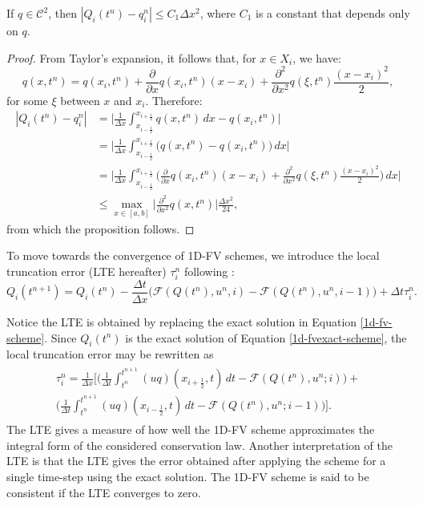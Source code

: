 \begin{prop}
	\label{prop-bound-centroid}
	If $q \in \mathcal{C}^2$, then $|Q_i(t^n)-q_i^n|\leq C_1 \Delta x^2$, where $C_1$ is a constant that depends only on $q$. 
\end{prop}
\begin{proof}
	From Taylor's expansion, it follows that, for $x \in X_i$, we have:
	\begin{equation}
		q(x,t^n) = q(x_i,t^n) +  
		\frac{\partial}{\partial x} q(x_i, t^n)(x-x_i) + 
		\frac{\partial^2}{\partial x^2} q(\xi, t^n)\frac{(x-x_i)^2}{2},
	\end{equation}
	for some $\xi$ between $x$ and $x_i$. Therefore:
	\begin{align*}
		|Q_{i}(t^n)-q_i^n| &= \bigg| \frac{1}{\Delta x} \int_{x_{i-\frac{1}{2}}}^{x_{i+\frac{1}{2}}} q(x,t^n)\,dx -q(x_i,t^n)  \bigg| \\ 
		&= \bigg| \frac{1}{\Delta x} \int_{x_{i-\frac{1}{2}}}^{x_{i+\frac{1}{2}}} \big(q(x,t^n) -q(x_i,t^n)\big) \,dx \bigg| \\ 
		&= \bigg| \frac{1}{\Delta x} \int_{x_{i-\frac{1}{2}}}^{x_{i+\frac{1}{2}}} 
		\bigg( \frac{\partial}{\partial x} q(x_i, t^n)(x-x_i) + 
		\frac{\partial^2}{\partial x^2} q(\xi, t^n)\frac{(x-x_i)^2}{2} \bigg) \,dx \bigg|\\ 
		&\leq \max_{x \in [a,b]}\bigg|\frac{\partial^2}{\partial x^2} q(x, t^n)\bigg| \frac{\Delta x^2}{24}, 
	\end{align*}
	from which the proposition follows.
\end{proof}

To move towards the convergence of 1D-FV schemes, we introduce the local truncation error (LTE hereafter)
$\tau_i^n$ following \citet{leveque:2002}:
\begin{equation}
	\label{consistency-1d-eq1}
	Q_i(t^{n+1}) = Q_i(t^n) - \frac{\Delta t}{\Delta x}
	\bigg(\mathcal{F}(Q(t^n),u^n,i)-\mathcal{F}(Q(t^n),u^n,i-1) \bigg) + \Delta t \tau_i^n.
\end{equation}

Notice the LTE is obtained by replacing the exact solution in Equation \eqref{1d-fv-scheme}.
Since $Q_i(t^n)$ is the exact solution of Equation \eqref{1d-fvexact-scheme}, 
the local truncation error may be rewritten as
\begin{align}
	\begin{split}
	\label{consistency-1d-eq2}
		\tau_{i}^n = 
		\frac{1}{\Delta x} \bigg[  \bigg( \frac{1}{\Delta t}\int_{t^{n}}^{t^{n+1}}
		{(uq)}(x_{i+\frac{1}{2}}, t) \,dt - \mathcal{F}(Q(t^n),u^n;i) \bigg) +\\
		\bigg( \frac{1}{\Delta t}\int_{t^{n}}^{t^{n+1}}
		{(uq)}(x_{i-\frac{1}{2}}, t) \,dt - \mathcal{F}(Q(t^n),u^n;i-1) \bigg)
		\bigg].
	\end{split}
\end{align}
The LTE gives a measure of how well the 1D-FV scheme approximates the integral form
of the considered conservation law. 
Another interpretation of the LTE is that the LTE gives the error obtained after applying
the scheme for a single time-step using the exact solution.
The 1D-FV scheme is said to be consistent
if the LTE converges to zero.

